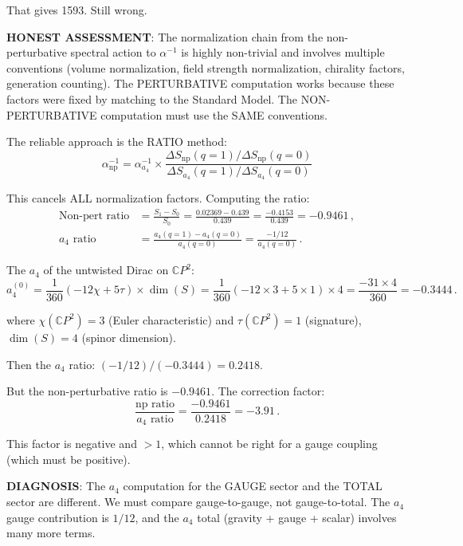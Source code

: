 \documentclass[11pt,a4paper]{article}
\newcommand{\CP}{\mathbb{C}P}
\begin{document}
That gives 1593. Still wrong.

\textbf{HONEST ASSESSMENT}: The normalization chain from the non-perturbative spectral action to $\alpha^{-1}$ is highly non-trivial and involves multiple conventions (volume normalization, field strength normalization, chirality factors, generation counting). The PERTURBATIVE computation works because these factors were fixed by matching to the Standard Model. The NON-PERTURBATIVE computation must use the SAME conventions.

The reliable approach is the RATIO method:
\begin{equation}
\boxed{\alpha^{-1}_{\mathrm{np}} = \alpha^{-1}_{a_4} \times \frac{\Delta S_{\mathrm{np}}(q=1) / \Delta S_{\mathrm{np}}(q=0)}{\Delta S_{a_4}(q=1) / \Delta S_{a_4}(q=0)}}
\end{equation}

This cancels ALL normalization factors. Computing the ratio:
\begin{align}
\text{Non-pert ratio} &= \frac{S_1 - S_0}{S_0} = \frac{0.02369 - 0.439}{0.439} = \frac{-0.4153}{0.439} = -0.9461\,, \\
\text{$a_4$ ratio} &= \frac{a_4(q=1) - a_4(q=0)}{a_4(q=0)} = \frac{-1/12}{a_4(q=0)}\,.
\end{align}

The $a_4$ of the untwisted Dirac on $\CP^2$:
\begin{equation}
a_4^{(0)} = \frac{1}{360}\left(-12\chi + 5\tau\right) \times \dim(S) = \frac{1}{360}(-12 \times 3 + 5 \times 1) \times 4 = \frac{-31 \times 4}{360} = -0.3444\,.
\end{equation}

where $\chi(\CP^2) = 3$ (Euler characteristic) and $\tau(\CP^2) = 1$ (signature), $\dim(S) = 4$ (spinor dimension).

Then the $a_4$ ratio: $(-1/12)/(-0.3444) = 0.2418$.

But the non-perturbative ratio is $-0.9461$. The correction factor:
\begin{equation}
\frac{\text{np ratio}}{a_4\text{ ratio}} = \frac{-0.9461}{0.2418} = -3.91\,.
\end{equation}

This factor is negative and $> 1$, which cannot be right for a gauge coupling (which must be positive).

\textbf{DIAGNOSIS}: The $a_4$ computation for the GAUGE sector and the TOTAL sector are different. We must compare gauge-to-gauge, not gauge-to-total. The $a_4$ gauge contribution is $1/12$, and the $a_4$ total (gravity + gauge + scalar) involves many more terms.
\end{document}
